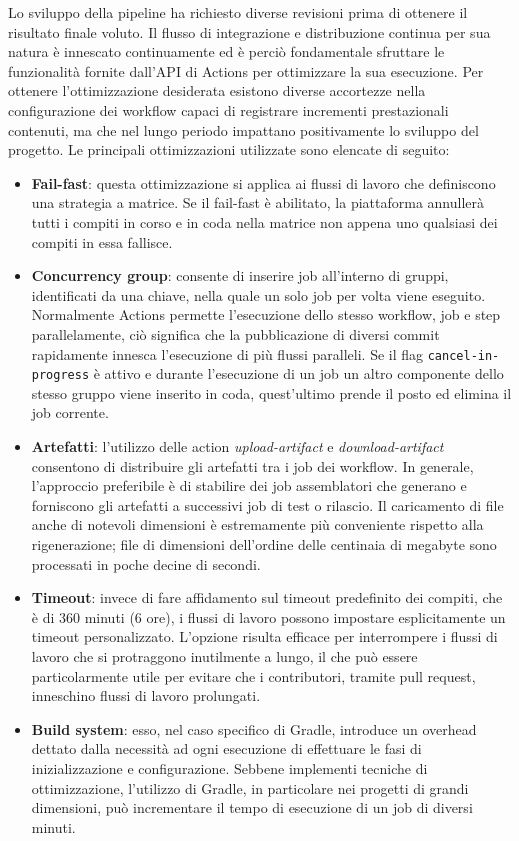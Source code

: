Lo sviluppo della pipeline ha richiesto diverse revisioni prima di ottenere il risultato finale voluto. Il flusso di integrazione e distribuzione continua per sua natura è innescato continuamente ed è perciò fondamentale sfruttare le funzionalità fornite dall'API di Actions per ottimizzare la sua esecuzione. Per ottenere l'ottimizzazione desiderata esistono diverse accortezze nella configurazione dei workflow capaci di registrare incrementi prestazionali contenuti, ma che nel lungo periodo impattano positivamente lo sviluppo del progetto. Le principali ottimizzazioni utilizzate sono elencate di seguito:
\begin{itemize}
	\item \textbf{Fail-fast}: questa ottimizzazione si applica ai flussi di lavoro che definiscono una strategia a matrice. Se il fail-fast è abilitato, la piattaforma annullerà tutti i compiti in corso e in coda nella matrice non appena uno qualsiasi dei compiti in essa fallisce.
	\item \textbf{Concurrency group}: consente di inserire job all'interno di gruppi, identificati da una chiave, nella quale un solo job per volta viene eseguito. Normalmente Actions permette l'esecuzione dello stesso workflow, job e step parallelamente, ciò significa che la pubblicazione di diversi commit rapidamente  innesca l'esecuzione di più flussi paralleli. Se il flag \texttt{cancel-in-progress} è attivo e durante l'esecuzione di un job un altro componente dello stesso gruppo viene inserito in coda, quest'ultimo prende il posto ed elimina il job corrente.
	\item \textbf{Artefatti}: l'utilizzo delle action \textit{upload-artifact} e \textit{download-artifact} consentono di distribuire gli artefatti tra i job dei workflow. In generale, l'approccio preferibile è di stabilire dei job assemblatori che generano e forniscono gli artefatti a successivi job di test o rilascio. Il caricamento di file anche di notevoli dimensioni è estremamente più conveniente rispetto alla rigenerazione; file di dimensioni dell'ordine delle centinaia di megabyte sono processati in poche decine di secondi.
	\item \textbf{Timeout}: invece di fare affidamento sul timeout predefinito dei compiti, che è di 360 minuti (6 ore), i flussi di lavoro possono impostare esplicitamente un timeout personalizzato. L'opzione risulta efficace per interrompere i flussi di lavoro che si protraggono inutilmente a lungo, il che può essere particolarmente utile per evitare che i contributori, tramite pull request, inneschino flussi di lavoro prolungati.
	\item \textbf{Build system}: esso, nel caso specifico di Gradle, introduce un overhead dettato dalla necessità ad ogni esecuzione di effettuare le fasi di inizializzazione e configurazione. Sebbene implementi tecniche di ottimizzazione, l'utilizzo di Gradle, in particolare nei progetti di grandi dimensioni, può incrementare il tempo di esecuzione di un job di diversi minuti.
\end{itemize}

